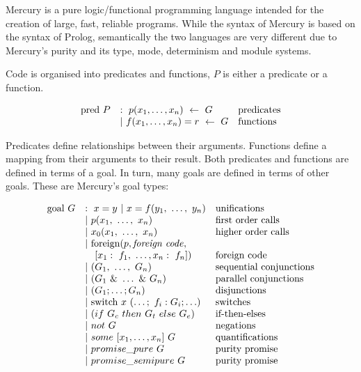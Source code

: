 

Mercury is a pure logic/functional programming language
intended for the creation of large, fast, reliable programs.
While the syntax of Mercury is based on the syntax of Prolog,
semantically the two languages are very different
due to Mercury's purity and its type, mode, determinism and module systems.

Code is organised into predicates and functions,
$P$ is either a predicate or a function.

$$
\begin{array}{lll}
\mbox{pred}~P
    & :~ p(x_1, \ldots, x_n)~\leftarrow~G
        & \hbox{predicates} \\
    & |~ f(x_1, \ldots, x_n)=r~\leftarrow~G
        & \hbox{functions} \\
\end{array}
$$

\noindent
Predicates define relationships between their arguments.
Functions define a mapping from their arguments to their result.
Both predicates and functions are defined in terms of a goal.
In turn, many goals are defined in terms of other goals.
These are Mercury's goal types:

$$
\begin{array}{lll}
\mbox{goal}~G
    & :~ x = y ~|~ x = f(y_1,~\ldots,~y_n)
        & \hbox{unifications}\\
    & |~ p(x_1,~\ldots,~x_n)
        & \hbox{first order calls} \\
    & |~ x_0(x_1,~\ldots,~x_n)
        & \hbox{higher order calls} \\
    & |~ \hbox{foreign}(p, \hbox{\emph{foreign code}},
        & \\
    & ~~~ [x_1:~f_1,~\ldots,x_n:~f_n])
        & \hbox{foreign code} \\
    & |~ (G_1,~\ldots,~G_n)
        & \hbox{sequential conjunctions}\\
    & |~ (G_1~\&~\ldots~\&~G_n)
        & \hbox{parallel conjunctions}\\
    & |~ (G_1 ; \ldots ; G_n)
        & \hbox{disjunctions}\\
    & |~ \hbox{switch}~x~(\ldots;~f_i: G_i ; \ldots)
        & \hbox{switches}\\
    & |~ (if~G_c~then~G_t~else~G_e)
        & \hbox{if-then-elses}\\
    & |~ not~G
        & \hbox{negations}\\
    & |~ some~[x_1,\ldots,x_n]~G
        & \hbox{quantifications}\\
    & |~ promise\_pure~G
        & \hbox{purity promise}\\
    & |~ promise\_semipure~G
        & \hbox{purity promise}\\
\end{array}
$$

